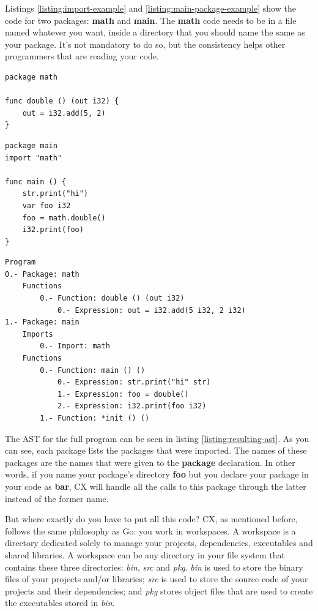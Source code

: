 \documentclass[11pt,fleqn,openany]{book} %
\begin{document}
Listings \ref{listing:import-example} and \ref{listing:main-package-example} show the code for two packages: \textbf{math} and \textbf{main}. The \textbf{math} code needs to be in a file named whatever you want, inside a directory that you should name the same as your package. It's not mandatory to do so, but the consistency helps other programmers that are reading your code.

\begin{lstlisting}[caption={Package to be imported},captionpos=b,label={listing:import-example}]
package math

func double () (out i32) {
	out = i32.add(5, 2)
}
\end{lstlisting}

\begin{lstlisting}[caption={The 'main' package},captionpos=b,label={listing:main-package-example}]
package main
import "math"

func main () {
	str.print("hi")
	var foo i32
	foo = math.double()
	i32.print(foo)
}
\end{lstlisting}

\begin{lstlisting}[caption={Abstract syntax tree of \ref{listing:main-package-example}},captionpos=b,label={listing:resulting-ast}]
Program
0.- Package: math
	Functions
		0.- Function: double () (out i32)
			0.- Expression: out = i32.add(5 i32, 2 i32)
1.- Package: main
	Imports
		0.- Import: math
	Functions
		0.- Function: main () ()
			0.- Expression: str.print("hi" str)
			1.- Expression: foo = double()
			2.- Expression: i32.print(foo i32)
		1.- Function: *init () ()
\end{lstlisting}

The AST for the full program can be seen in listing \ref{listing:resulting-ast}. As you can see, each package lists the packages that were imported. The names of these packages are the names that were given to the \textbf{package} declaration. In other words, if you name your package's directory \textbf{foo} but you declare your package in your code as \textbf{bar}, CX will handle all the calls to this package through the latter instead of the former name.

But where exactly do you have to put all this code? CX, as mentioned before, follows the same philosophy as Go: you work in workspaces. A workspace is a directory dedicated solely to manage your projects, dependencies, executables and shared libraries. A workspace can be any directory in your file system that contains these three directories: \emph{bin}, \emph{src} and \emph{pkg}. \emph{bin} is used to store the binary files of your projects and/or libraries; \emph{src} is used to store the source code of your projects and their dependencies; and \emph{pkg} stores object files that are used to create the executables stored in \emph{bin}.
\end{document}
